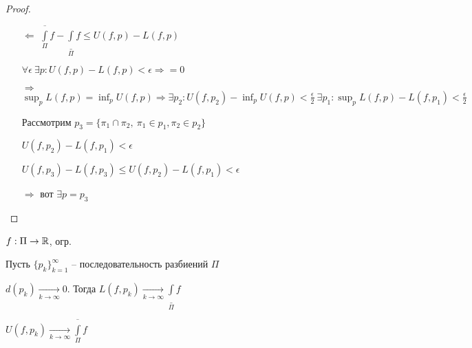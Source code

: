     \begin{proof}
        $ $
        \begin{enumerate}
            \item[$\boxed{\Leftarrow}$] $\underset{\Pi}{\overline{\int}} f - \underset{\Pi}{\underline{\int}} f \le U(f, p) - L(f, p)$
                \par $\forall \epsilon \ \exists p : U(f, p) - L(f, p) < \epsilon \Rightarrow = 0$
            \item[$\boxed{\Rightarrow}$] $\sup_p L(f, p) = \inf_p U(f, p) \Rightarrow \exists p_2 : U(f, p_2) - \inf_p U(f, p) < \frac \epsilon 2 \ \exists p_1 : \sup_p L(f, p) - L(f, p_1) < \frac \epsilon 2$
                \par Рассмотрим $p_3 = \{\pi_1 \cap \pi_2, \ \pi_1 \in p_1, \pi_2 \in p_2\}$
                \par $U(f, p_2) - L(f, p_1) < \epsilon$
                \par $U(f, p_3) - L(f, p_3) \le U(f, p_2) - L(f, p_1) < \epsilon$ %
                \par $\Rightarrow$ вот $\exists p = p_3$
        \end{enumerate}
    \end{proof}

    \begin{lemma}
        $f : \Pi \rightarrow \mathbb{R}$, огр.
        \par Пусть $\{p_k\}_{k=1}^\infty$ -- последовательность разбиений $\Pi$
        \par $d(p_k) \xrightarrow[k \rightarrow \infty]{} 0$. Тогда $L(f, p_k) \xrightarrow[k \rightarrow \infty]{} \underset{\Pi}{\underline{\int}} f$
        \par $U(f, p_k) \xrightarrow[k \rightarrow \infty]{} \underset{\Pi}{\overline{\int}} f$
    \end{lemma}

